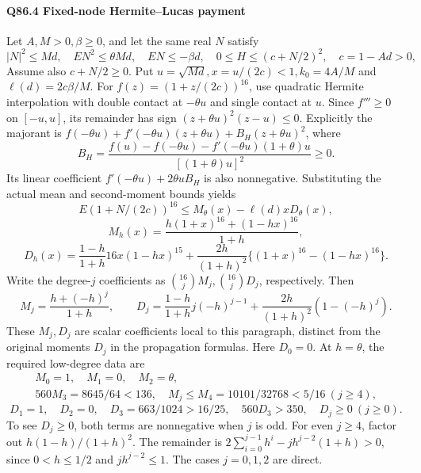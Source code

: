 \paragraph{Q86.4 Fixed-node Hermite--Lucas payment}
Let \(A,\allowbreak M>\allowbreak 0,\allowbreak \beta\ge\allowbreak 0\), and let the same real \(N\) satisfy
\[
|N|^2\le Md,\quad EN^2\le\theta Md,\quad EN\le-\beta d,
\quad 0\le H\le(c+N/2)^2,
\quad c=1-Ad>0,
\tag{Q86.4.1}\label{eq:Q86:4.1}
\]
Assume also \(c+N/2\ge\allowbreak 0\). Put
\(u=\allowbreak \sqrt{Md},\allowbreak x=\allowbreak u/(2c)<\allowbreak 1,\allowbreak k_0=\allowbreak 4A/M\) and \(\ell(d)=\allowbreak 2c\beta/M\).
For \(f(z)=\allowbreak (1+z/(2c))^{16}\), use quadratic Hermite interpolation with double contact at \(-\theta u\) and single contact at \(u\).
Since \(f'''\ge\allowbreak 0\) on \([-u,\allowbreak u]\), its remainder has sign
\((z+\theta u)^2(z-u)\le\allowbreak 0\).
Explicitly the majorant is
\(f(-\theta u)+f'(-\theta u)(z+\theta u)+B_H(z+\theta u)^2\), where
\[
B_H=
\frac{f(u)-f(-\theta u)-f'(-\theta u)(1+\theta)u}{[(1+\theta)u]^2}
\ge0.
\]
Its linear coefficient \(f'(-\theta u)+2\theta uB_H\) is also nonnegative.
Substituting the actual mean and second-moment bounds yields
\[
E(1+N/(2c))^{16}\le M_\theta(x)-\ell(d)xD_\theta(x),
\tag{Q86.4.2}\label{eq:Q86:4.2}
\]
\[
M_h(x)=\frac{h(1+x)^{16}+(1-hx)^{16}}{1+h},
\]
\[
D_h(x)=\frac{1-h}{1+h}16x(1-hx)^{15}
 +\frac{2h}{(1+h)^2}\{(1+x)^{16}-(1-hx)^{16}\}.
\]
Write the degree-\(j\) coefficients as
\(\binom{16}{j}M_j,\allowbreak \binom{16}{j}D_j\), respectively. Then
\[
M_j=\frac{h+(-h)^j}{1+h},\qquad
D_j=\frac{1-h}{1+h}j(-h)^{j-1}
 +\frac{2h}{(1+h)^2}(1-(-h)^j).
\tag{Q86.4.3}\label{eq:Q86:4.3}
\]
These \(M_j,\allowbreak D_j\) are scalar coefficients local to this paragraph, distinct from the original moments \(D_j\) in the propagation formulas.
Here \(D_0=\allowbreak 0\). At \(h=\allowbreak \theta\), the required low-degree data are
\[
\begin{gathered}
M_0=1,\quad M_1=0,\quad M_2=\theta,\qquad\\
560M_3=8645/64<136,\quad M_j\le M_4=10101/32768<5/16\ (j\ge4),
\end{gathered}
\]
\[
D_1=1,\quad D_2=0,\quad D_3=663/1024>16/25,
\quad560D_3>350,\quad D_j\ge0\ (j\ge0).
\tag{Q86.4.4}\label{eq:Q86:4.4}
\]
To see \(D_j\ge\allowbreak 0\), both terms are nonnegative when \(j\) is odd.
For even \(j\ge\allowbreak 4\), factor out \(h(1-h)/(1+h)^2\).
The remainder is
\(2\sum_{i=\allowbreak 0}^{j-1}h^i-jh^{j-2}(1+h)>\allowbreak 0\),
since \(0<\allowbreak h\le\allowbreak 1/2\) and \(jh^{j-2}\le\allowbreak 1\).
The cases \(j=\allowbreak 0,\allowbreak 1,\allowbreak 2\) are direct.

